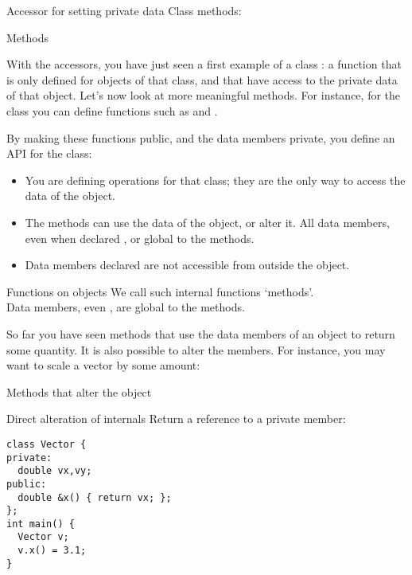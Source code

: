 \begin{block}{Accessor for setting private data}
  \label{sl:class-private-set}
  Class methods:
\end{block}

 {Methods}

With the accessors, you have just seen a first example of a class
: a function that is only defined for objects of
that class, and that have access to the private data of that object.
Let's now look at more meaningful methods. For instance, for the
 class you can define functions such as  and
. 
%

By making these functions public, and the data members
private, you define an \acf{API} for the class:
\begin{itemize}
\item You are defining operations for that class; they are the only
  way to access the data of the object.
\item The methods can use the data of the object, or alter it. All
  data members, even when declared , or global to the methods.
\item  Data members declared  are not accessible from outside the
  object.
\end{itemize}

\begin{slide}{Functions on objects}
  \label{sl:obj-func}
  We call such internal functions `methods'.\\
  Data members, even , are global to the methods.
\end{slide}

So far you have seen methods that use the data members of an object to
return some quantity. It is also possible to alter the members. 
For instance, you may want to scale a vector by some amount:
%

\begin{slide}{Methods that alter the object}
  \label{sl:obj-func-on}
\end{slide}

\begin{block}{Direct alteration of internals}
  \label{sl:obj-return-ref}
  Return a reference to a private member:
\begin{verbatim}
class Vector {
private:
  double vx,vy;
public:
  double &x() { return vx; };
};
int main() {
  Vector v;
  v.x() = 3.1;
}
\end{verbatim}
\end{block}

